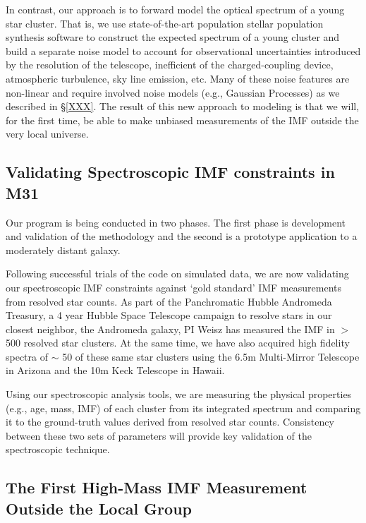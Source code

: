 \documentclass[11pt,preprint]{aastex}
\begin{document}
In contrast, our approach is to forward model the optical spectrum of a young star cluster.  That is, we use state-of-the-art population stellar population synthesis software to construct the expected spectrum of a young cluster and build a separate noise model to account for observational uncertainties introduced by the resolution of the telescope, inefficient of the charged-coupling device, atmospheric turbulence, sky line emission, etc.  Many of these noise features are non-linear and require involved noise models (e.g., Gaussian Processes) as we described in \S \ref{XXX}.  The result of this new approach to modeling is that we will, for the first time, be able to make unbiased measurements of the IMF outside the very local universe.  

\subsection{Validating Spectroscopic IMF constraints in M31}

Our program is being conducted in two phases.  The first phase is development and validation of the methodology and the second is a prototype application to a moderately distant galaxy.

Following successful trials of the code on simulated data, we are now validating our spectroscopic IMF constraints against `gold standard' IMF measurements from resolved star counts.  As part of the Panchromatic Hubble Andromeda Treasury, a 4 year Hubble Space Telescope campaign to resolve stars in our closest neighbor, the Andromeda galaxy, PI Weisz has measured the IMF in $>$500 resolved star clusters.  At the same time, we have also acquired high fidelity spectra of $\sim$ 50 of these same star clusters using the 6.5m Multi-Mirror Telescope in Arizona and the 10m Keck Telescope in Hawaii.  

Using our spectroscopic analysis tools, we are measuring the physical properties (e.g., age, mass, IMF) of each cluster from its integrated spectrum and comparing it to the ground-truth values derived from resolved star counts.  Consistency between these two sets of parameters will provide key validation of the spectroscopic technique. 





\subsection{The First High-Mass IMF Measurement Outside the Local Group}
\end{document}

